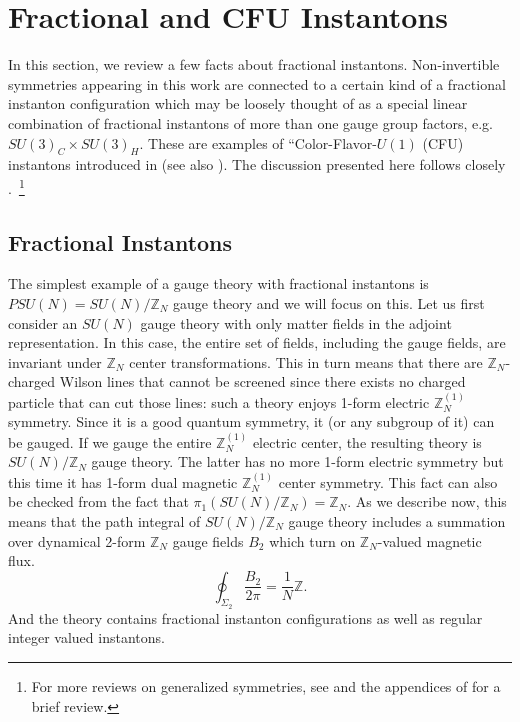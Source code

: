 \documentclass[11pt,a4paper]{article}
\def\beq{\begin{equation}}
\def\eeq{\end{equation}}
\begin{document}
\appendix

\section{Fractional and CFU Instantons}
\label{app:fractionalInstanton}

In this section, we review a few facts about fractional instantons. Non-invertible symmetries appearing in this work are connected to a certain kind of a fractional instanton configuration which may be loosely thought of as a special linear combination of fractional instantons of more than one gauge group factors, e.g.~$SU(3)_C \times SU(3)_H$. These are examples of ``Color-Flavor-$U(1)$ (CFU) instantons introduced in \cite{Anber:2021iip} (see also \cite{Anber:2019nze}). The discussion presented here follows closely \cite{Brennan:2023mmt, Anber:2021iip}.~\footnote{For more reviews on generalized symmetries, see \cite{Gomes:2023ahz, Bhardwaj:2023kri, Luo:2023ive, Shao:2023gho} and the appendices of \cite{Brennan:2023kpw} for a brief review.}

\subsection{Fractional Instantons}

The simplest example of a gauge theory with fractional instantons is $PSU(N) = SU(N) / \mathbb{Z}_N$ gauge theory and we will focus on this.
Let us first consider an $SU(N)$ gauge theory with only matter fields in the adjoint representation. In this case, the entire set of fields, including the gauge fields, are invariant under $\mathbb{Z}_N$ center transformations. This in turn means that there are $\mathbb{Z}_N$-charged Wilson lines that cannot be screened since there exists no charged particle that can cut those lines: such a theory enjoys 1-form electric $\mathbb{Z}_N^{(1)}$ symmetry. Since it is a good quantum symmetry, it (or any subgroup of it) can be gauged. If we gauge the entire $\mathbb{Z}_N^{(1)}$ electric center, the resulting theory is $SU(N) / \mathbb{Z}_N$ gauge theory. The latter has no more 1-form electric symmetry but this time it has 1-form dual magnetic $\mathbb{Z}_N^{(1)}$ center symmetry. This fact can also be checked from the fact that $\pi_1 (SU(N) / \mathbb{Z}_N) = \mathbb{Z}_N$. As we describe now, this means that the path integral of $SU(N) / \mathbb{Z}_N$ gauge theory includes a summation over dynamical 2-form $\mathbb{Z}_N$ gauge fields $B_2$ which turn on $\mathbb{Z}_N$-valued magnetic flux. 
%
\beq
\oint_{\Sigma_2} \frac{B_2}{2\pi} = \frac{1}{N} \mathbb{Z}.
\eeq
%
And the theory contains fractional instanton configurations as well as regular integer valued instantons. 
\end{document}
